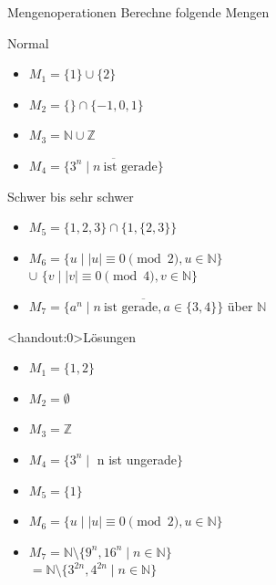 {
\begin{frame}{Mengenoperationen}
    Berechne folgende Mengen
    \begin{alertblock}{Normal}
        \begin{itemize}
            \item $M_1 = \{1\}\cup \{2\}$
            \item $M_2 = \{\} \cap \{-1, 0, 1\}$
            \item $M_3 = \mathbb{N} \cup \mathbb{Z}$
            \item $M_4 = \overline{\{3^{n}\mid n \ \text{ist gerade}\} }$
        \end{itemize}
    \end{alertblock}
        \begin{alertblock}{Schwer bis sehr schwer}
        \begin{itemize}
            \item $M_5 = \{1, 2, 3\} \cap  \{1, \{2, 3\}\}$
            \item $M_6 = \{u \mid |u| \equiv 0 \pmod 2, u \in \mathbb{N}\}$\\\hspace{0.65cm}$\cup$ $\{v \mid |v| \equiv 0 \pmod 4, v \in \mathbb{N}\}$
            \item $M_7 = \overline{\{a^{n} \mid n \ \text{ist gerade}, a \in \{3,4\}\}}$ über $\mathbb{N}$
        \end{itemize}
    \end{alertblock}
\end{frame}

\begin{frame}<handout:0>{Lösungen}
  \begin{itemize}[<+- | alert@+>]
        \item 
            $M_1 = \{1, 2\}$
        \item
            $M_2 = \emptyset$
        \item
            $M_3 = \mathbb{Z}$
        \item
            $M_4 = \{3^{n} \mid$ n ist ungerade$\}$ 
        \item
            $M_5 = \{1\}$
        \item
            $M_6 = \{u \mid |u| \equiv 0 \pmod 2, u \in \mathbb{N}\}$
        \item
            $M_7 = \mathbb{N} \setminus \{9^n, 16^n \mid n \in \mathbb N\}$\\
            \hspace{0.44cm}$ = \mathbb{N} \setminus \{3^{2n}, 4^{2n} \mid n \in \mathbb N\}$
    \end{itemize}
\end{frame}
}
